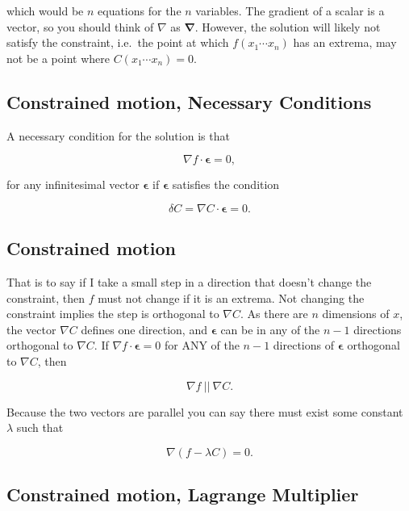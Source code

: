 \documentclass[%
oneside,                 %
final,                   %
10pt]{article}
\begin{document}
which would be $n$ equations for the $n$ variables. The gradient of a
scalar is a vector, so you should think of $\nabla$ as
$\bm{\nabla}$. However, the solution will likely not satisfy the
constraint, i.e.~the point at which $f(x_1\cdots x_n)$ has an extrema,
may not be a point where $C(x_1\cdots x_n)=0$.

\subsection{Constrained motion, Necessary Conditions}

A necessary condition for the solution is that

\begin{equation}
\nabla f\cdot\bm{\epsilon}=0,
\end{equation}

for any infinitesimal vector $\bm{\epsilon}$ if $\bm{\epsilon}$
satisfies the condition

\begin{equation}
\delta C=\nabla C\cdot\bm{\epsilon}=0.
\end{equation}

\subsection{Constrained motion}

That is to say if I take a small step in a direction that doesn't
change the constraint, then $f$ must not change if it is an
extrema. Not changing the constraint implies the step is orthogonal to
$\nabla C$. As there are $n$ dimensions of $x$, the vector $\nabla C$
defines one direction, and $\bm{\epsilon}$ can be in any of the $n-1$
directions orthogonal to $\nabla C$. If $\nabla f\cdot\bm{\epsilon}=0$
for ANY of the $n-1$ directions of $\bm{\epsilon}$ orthogonal to
$\nabla C$, then

\begin{equation}
\nabla f ~||~ \nabla C.
\end{equation}

Because the two vectors are parallel you can say there must exist some
constant $\lambda$ such that

\begin{equation}
\nabla(f-\lambda C)=0.
\end{equation}

\subsection{Constrained motion, Lagrange Multiplier}
\end{document}

